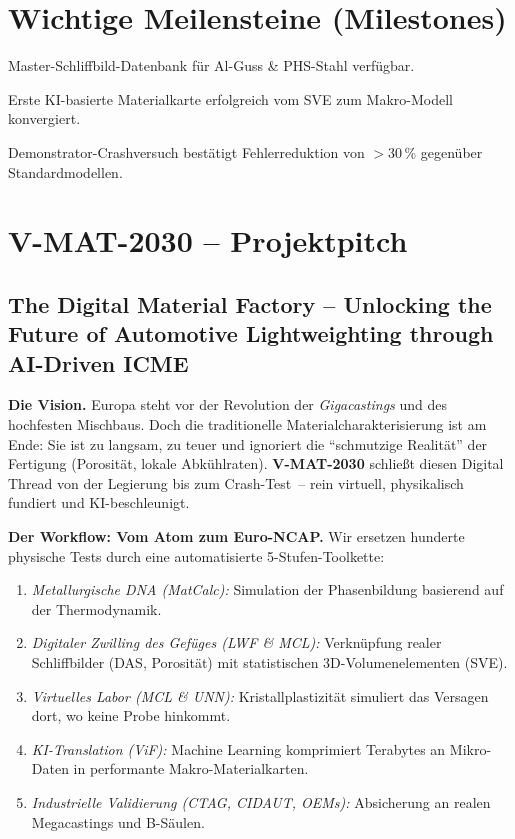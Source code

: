 \documentclass[12pt,a4paper]{article}
\begin{document}
\section{Wichtige Meilensteine (Milestones)}

\begin{description}[leftmargin=*]
  \item[MS\,1 (M12):] Master-Schliffbild-Datenbank für Al-Guss \& PHS-Stahl
        verfügbar.
  \item[MS\,2 (M24):] Erste KI-basierte Materialkarte erfolgreich vom SVE
        zum Makro-Modell konvergiert.
  \item[MS\,3 (M36):] Demonstrator-Crashversuch bestätigt Fehlerreduktion
        von $>30\,\%$ gegenüber Standardmodellen.
\end{description}

\section{V-MAT-2030 -- Projektpitch}

\subsection*{The Digital Material Factory -- Unlocking the Future of
  Automotive Lightweighting through AI-Driven ICME}

\textbf{Die Vision.}
Europa steht vor der Revolution der \emph{Gigacastings} und des hochfesten
Mischbaus. Doch die traditionelle Materialcharakterisierung ist am Ende: Sie
ist zu langsam, zu teuer und ignoriert die "`schmutzige Realität"' der
Fertigung (Porosität, lokale Abkühlraten). \textbf{V-MAT-2030} schließt
diesen Digital Thread von der Legierung bis zum Crash-Test~-- rein virtuell,
physikalisch fundiert und KI-beschleunigt.

\textbf{Der Workflow: Vom Atom zum Euro-NCAP.}
Wir ersetzen hunderte physische Tests durch eine automatisierte
5-Stufen-Toolkette:
\begin{enumerate}[leftmargin=*]
  \item \emph{Metallurgische DNA (MatCalc):} Simulation der Phasenbildung
        basierend auf der Thermodynamik.
  \item \emph{Digitaler Zwilling des Gefüges (LWF \& MCL):} Verknüpfung
        realer Schliffbilder (DAS, Porosität) mit statistischen
        3D-Volumenelementen (SVE).
  \item \emph{Virtuelles Labor (MCL \& UNN):} Kristallplastizität simuliert
        das Versagen dort, wo keine Probe hinkommt.
  \item \emph{KI-Translation (ViF):} Machine Learning komprimiert Terabytes
        an Mikro-Daten in performante Makro-Materialkarten.
  \item \emph{Industrielle Validierung (CTAG, CIDAUT, OEMs):} Absicherung an
        realen Megacastings und B-Säulen.
\end{enumerate}
\end{document}

